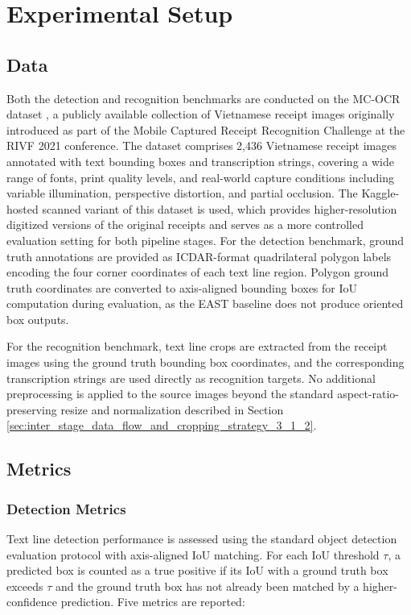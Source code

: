 \section{Experimental Setup}
\subsection{Data}
Both the detection and recognition benchmarks are conducted on the MC-OCR dataset \cite{Vu2021}, a publicly available collection of Vietnamese receipt images originally introduced as part of the Mobile Captured Receipt Recognition Challenge at the RIVF 2021 conference. The dataset comprises 2,436 Vietnamese receipt images annotated with text bounding boxes and transcription strings, covering a wide range of fonts, print quality levels, and real-world capture conditions including variable illumination, perspective distortion, and partial occlusion. The Kaggle-hosted scanned variant of this dataset is used, which provides higher-resolution digitized versions of the original receipts and serves as a more controlled evaluation setting for both pipeline stages.
For the detection benchmark, ground truth annotations are provided as ICDAR-format quadrilateral polygon labels encoding the four corner coordinates of each text line region. Polygon ground truth coordinates are converted to axis-aligned bounding boxes for IoU computation during evaluation, as the EAST baseline does not produce oriented box outputs.

For the recognition benchmark, text line crops are extracted from the receipt images using the ground truth bounding box coordinates, and the corresponding transcription strings are used directly as recognition targets. No additional preprocessing is applied to the source images beyond the standard aspect-ratio-preserving resize and normalization described in Section \ref{sec:inter_stage_data_flow_and_cropping_strategy_3_1_2}.

\subsection{Metrics}
\subsubsection{Detection Metrics}

Text line detection performance is assessed using the standard object detection evaluation protocol with axis-aligned IoU matching. For each IoU threshold $\tau$, a predicted box is counted as a true positive if its IoU with a ground truth box exceeds $\tau$ and the ground truth box has not already been matched by a higher-confidence prediction. Five metrics are reported:

